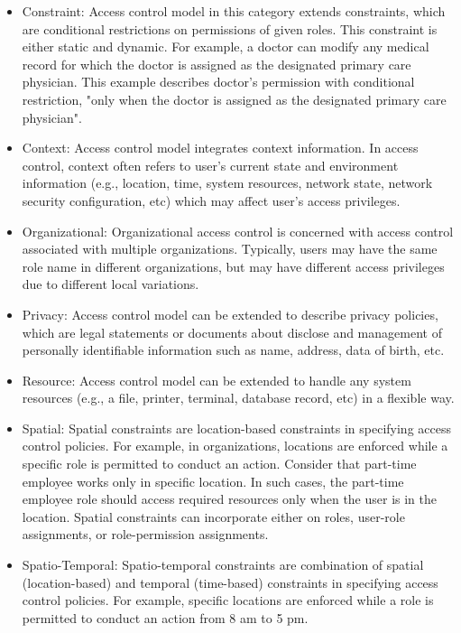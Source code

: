 \begin{itemize}

  \item Constraint: Access control model in this category extends constraints, which are conditional restrictions on permissions of given roles. This constraint is either static and dynamic. For example, a doctor can modify any medical record for which the doctor is assigned as the designated primary care physician. This example describes doctor's permission with conditional restriction, "only when the doctor is assigned as the designated primary care physician".

  \item Context: Access control model integrates context information. In access control, context often refers to user's current state and environment information (e.g., location, time, system resources, network state, network security configuration, etc) which may affect user's access privileges.

  \item Organizational: Organizational access control is concerned with access control associated with multiple organizations. Typically, users may have the same role name in different organizations, but may have different access privileges due to different local variations.
  
  \item Privacy: Access control model can be extended to describe privacy policies, which are legal statements or documents about disclose and management of personally identifiable information such as name, address, data of birth, etc.

  \item Resource: Access control model can be extended to handle any system resources (e.g., a file, printer, terminal, database record, etc) in a flexible way. 

  \item Spatial:  Spatial constraints are location-based constraints in specifying access
	control policies. For example, in organizations, 	locations are enforced while a
	specific role is permitted to conduct an action. Consider that part-time employee works only in specific location.
	In such cases, the part-time employee role should access required resources only when the user is in the location. 
	Spatial constraints can incorporate either on roles, user-role assignments, or role-permission assignments. 

  \item Spatio-Temporal: Spatio-temporal constraints are combination of spatial (location-based) and temporal (time-based) constraints in specifying access control policies. For example, specific locations are enforced while a role is permitted to conduct an action from 8 am to 5 pm.


\end{itemize}
